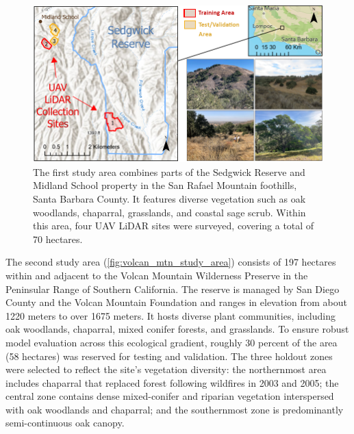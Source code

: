 \documentclass[preprint,12pt,authoryear]{elsarticle}
\begin{document}
\begin{figure}[b]
  \centering
  \includegraphics[width=\linewidth]{manuscript/figures/Sedgwick_Reserve_Study_Area.png}
    \caption{The first study area combines parts of the Sedgwick Reserve and Midland School property in the San Rafael Mountain foothills, Santa Barbara County. It features diverse vegetation such as oak woodlands, chaparral, grasslands, and coastal sage scrub. Within this area, four UAV LiDAR sites were surveyed, covering a total of 70 hectares.}
  \label{fig:sedgwick_study_area}
\end{figure}

\FloatBarrier   %



The second study area (\ref{fig:volcan_mtn_study_area}) consists of 197 hectares within and adjacent to the Volcan Mountain Wilderness Preserve in the Peninsular Range of Southern California. The reserve is managed by San Diego County and the Volcan Mountain Foundation and ranges in elevation from about 1220 meters to over 1675 meters. It hosts diverse plant communities, including oak woodlands, chaparral, mixed conifer forests, and grasslands.  To ensure robust model evaluation across this ecological gradient, roughly 30 percent of the area (58 hectares) was reserved for testing and validation. The three holdout zones were selected to reflect the site’s vegetation diversity: the northernmost area includes chaparral that replaced forest following wildfires in 2003 and 2005; the central zone contains dense mixed-conifer and riparian vegetation interspersed with oak woodlands and chaparral; and the southernmost zone is predominantly semi-continuous oak canopy. 
\end{document}
